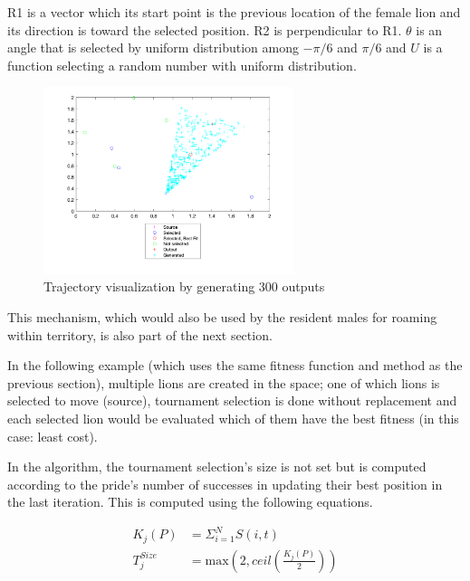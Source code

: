 \par {R1} is a vector which its start point is the previous location of the female lion and its direction is toward the selected position. {R2} is perpendicular to {R1}. $\theta$ is an angle that is selected by uniform distribution among $-\pi/6$ and $\pi/6$ and $U$ is a function selecting a random number with uniform distribution.

\begin{figure}[h]
\begin{center}
\includegraphics[width=0.65\textwidth]{img/moving/move-out-legend}
\caption{Trajectory visualization by generating 300 outputs}
\end{center}
\end{figure}

\par This mechanism, which would also be used by the resident males for roaming within territory, is also part of the next section.

\par In the following example (which uses the same fitness function and method as the previous section), multiple lions are created in the space; one of which lions is selected to move (source), tournament selection is done without replacement and each selected lion would be evaluated which of them have the best fitness (in this case: least cost).

\par In the algorithm, the tournament selection's size is not set but is computed according to the pride's number of successes in updating their best position in the last iteration. This is computed using the following equations.

\begin{align*}
    K_j(P) &= \Sigma_{i=1}^N  S(i,t) \\
    T_j^{Size} &= \text{max}\left(2, ceil\left(\frac{K_j(P)}{2}\right)\right)
\end{align*}


